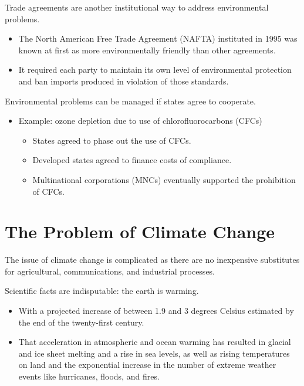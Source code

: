 \documentclass[
]{book}
\begin{document}
Trade agreements are another institutional way to address environmental problems.

\begin{itemize}
\item
  The North American Free Trade Agreement (NAFTA) instituted in 1995 was known at first as more environmentally friendly than other agreements.
\item
  It required each party to maintain its own level of environmental protection and ban imports produced in violation of those standards.
\end{itemize}

Environmental problems can be managed if states agree to cooperate.

\begin{itemize}
\item
  Example: ozone depletion due to use of chlorofluorocarbons (CFCs)

  \begin{itemize}
  \item
    States agreed to phase out the use of CFCs.
  \item
    Developed states agreed to finance costs of compliance.
  \item
    Multinational corporations (MNCs) eventually supported the prohibition of CFCs.
  \end{itemize}
\end{itemize}

\hypertarget{the-problem-of-climate-change}{%
\section{The Problem of Climate Change}\label{the-problem-of-climate-change}}

The issue of climate change is complicated as there are no inexpensive substitutes for agricultural, communications, and industrial processes.

Scientific facts are indisputable: the earth is warming.

\begin{itemize}
\item
  With a projected increase of between 1.9 and 3 degrees Celsius estimated by the end of the twenty-first century.
\item
  That acceleration in atmospheric and ocean warming has resulted in glacial and ice sheet melting and a rise in sea levels, as well as rising temperatures on land and the exponential increase in the number of extreme weather events like hurricanes, floods, and fires.
\end{itemize}
\end{document}
